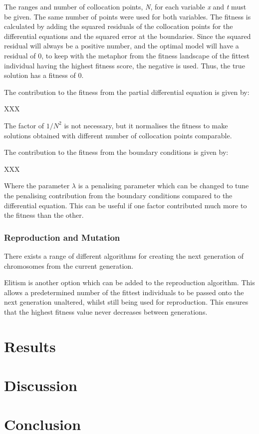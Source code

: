 \documentclass[multicolumn, 12pt]{extarticle}
\begin{document}
The ranges and number of collocation points, \textit{N}, for each variable \textit{x} and \textit{t} must be given. The same number of points were used for both variables. The fitness is calculated by adding the squared residuals of the collocation points for the differential equations and the squared error at the boundaries. Since the squared residual will always be a positive number, and the optimal model will have a residual of 0, to keep with the metaphor from the fitness landscape of the fittest individual having the highest fitness score, the negative is used. Thus, the true solution has a fitness of 0. 

The contribution to the fitness from the partial differential equation is given by: 

XXX

The factor of $1/N^{2}$ is not necessary, but it normalises the fitness to make solutions obtained with different number of collocation points comparable. 

The contribution to the fitness from the boundary conditions is given by: 

XXX

Where the parameter $\lambda$ is a penalising parameter which can be changed to tune the penalising contribution from the boundary conditions compared to the differential equation. This can be useful if one factor contributed much more to the fitness than the other. 

\subsubsection{Reproduction and Mutation}
There exists a range of different algorithms for creating the next generation of chromosomes from the current generation. 

Elitism is another option which can be added to the reproduction algorithm. This allows a predetermined number of the fittest individuals to be passed onto the next generation unaltered, whilst still being used for reproduction. This ensures that the highest fitness value never decreases between generations. 




\section{Results}

\section{Discussion}

\section{Conclusion}
\end{document}
